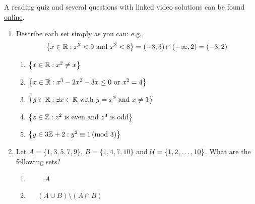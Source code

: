 \begin{exercises}{}{}
	A reading quiz and several questions with linked video solutions can be found \href{http://www.math.uci.edu/~ndonalds/math13/selftest/4-2-union.html}{online}.
	
	\begin{enumerate}
	  \item Describe each set simply as you can: e.g., 
	  \[
	  	\bigl\{x\in\mathbb{R}:x^2<9\text{ and } x^3<8\bigr\}= (-3,3)\cap(-\infty,2) =(-3,2)
	  \]
	  \begin{enumerate}
		 	\item $\bigl\{x\in\mathbb{R}:x^2\neq x\bigr\}$
			\item $\bigl\{x\in\mathbb{R}:x^3-2x^2-3x\le 0\text{ or }x^2=4\bigl\}$
			\item $\bigl\{y\in\mathbb{R}:\exists x\in\mathbb{R} \text{ with }y=x^2 \text{ and }x\neq 1\bigl\}$
			\item $\bigl\{z\in\mathbb{Z}:z^2\text{ is even and $z^3$ is odd}\bigl\}$
			\item $\bigl\{y\in 3\mathbb{Z}+2:y^2\equiv 1\negthickspace\pmod{3}\bigl\}$
		\end{enumerate}
	  
	  \item Let $A=\{1,3,5,7,9\}$, $B=\{1,4,7,10\}$ and $\mathcal{U}=\{1,2,\ldots,10\}$. What are the following sets?
	    \begin{enumerate}
		  	\item {} \  \  \ $\comp A$ 
		  	\setcounter{enumii}{4}
		  	\item {} \  \ $(A\cup B)\setminus (A\cap B)$
			\end{enumerate}
	
  	

	

\end{enumerate}
\end{exercises}
